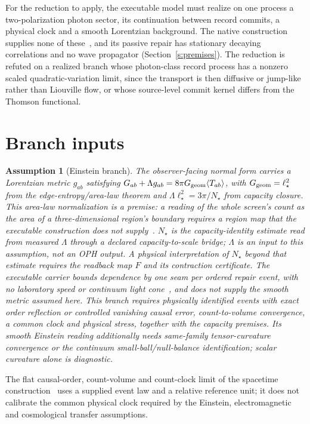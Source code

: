 \documentclass[11pt]{article}
\newtheorem{assumption}[theorem]{Assumption}
\theoremstyle{remark}
\begin{document}
For the reduction to apply, the executable model must realize on one
process a two-polarization photon sector, its continuation between record
commits, a physical clock and a smooth Lorentzian background. The native
construction supplies none of these~\cite{ophmodel,ophspine}, and its
passive repair has stationary decaying correlations and no wave propagator
(Section~\ref{s:premises}). The reduction is refuted on a realized branch
whose photon-class record process has a nonzero scaled quadratic-variation
limit, since the transport is then diffusive or jump-like rather than
Liouville flow, or whose source-level commit kernel differs from the
Thomson functional.

\section{Branch inputs}

\begin{assumption}[Einstein branch]\label{a:geom}
The observer-facing normal form carries a Lorentzian metric $g_{ab}$
satisfying $G_{ab}+\Lambda g_{ab}=8\pi G_{\rm geom}\langle T_{ab}\rangle$,
with $G_{\rm geom}=\ell_\star^2$ from the edge-entropy/area-law theorem and
$\Lambda\ell_\star^2=3\pi/N_\star$ from capacity closure. This area-law
normalization is a premise: a reading of the whole screen's count as the
area of a three-dimensional region's boundary requires a region map that the
executable construction does not supply~\cite{ophentropy}. $N_\star$ is the
capacity-identity estimate read from measured $\Lambda$ through a declared
capacity-to-scale bridge; $\Lambda$ is an input to this assumption, not an
OPH output. A physical interpretation of $N_\star$ beyond that estimate
requires the readback map $F$ and its contraction certificate.
The executable carrier bounds dependence by one seam per ordered repair
event, with no laboratory speed or continuum light cone~\cite{ophcausality},
and does not supply the smooth metric assumed here. This branch requires physically identified
events with exact order reflection or controlled vanishing causal error,
count-to-volume convergence, a common clock and physical stress, together
with the capacity premises. Its smooth Einstein reading additionally needs
same-family tensor-curvature convergence or the continuum
small-ball/null-balance identification; scalar curvature alone is diagnostic.
\end{assumption}

The flat causal-order, count-volume and count-clock limit of the spacetime
construction~\cite{ophEinstein} uses a supplied event law and a relative
reference unit; it does not calibrate the common physical clock required by
the Einstein, electromagnetic and cosmological transfer assumptions.
\end{document}
